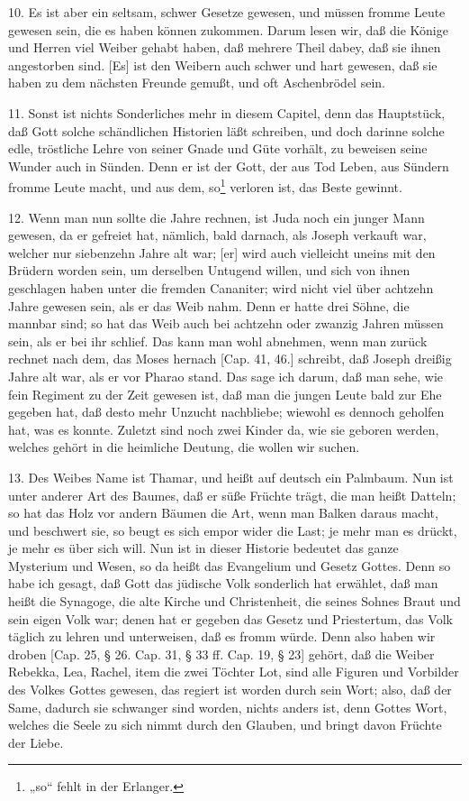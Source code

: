 10. Es ist aber ein seltsam, schwer Gesetze gewesen, und müssen fromme Leute gewesen sein, die es haben können zukommen. Darum lesen wir, daß die Könige und Herren viel Weiber gehabt haben, daß mehrere Theil dabey, daß sie ihnen angestorben sind. [Es] ist den Weibern auch schwer und hart gewesen, daß sie haben zu dem nächsten Freunde gemußt, und oft Aschenbrödel sein.

11. Sonst ist nichts Sonderliches mehr in diesem Capitel, denn das Hauptstück, daß Gott solche schändlichen Historien läßt schreiben, und doch darinne solche edle, tröstliche Lehre von seiner Gnade und Güte vorhält, zu beweisen seine Wunder auch in Sünden. Denn er ist der Gott, der aus Tod Leben, aus Sündern fromme Leute macht, und aus dem, so\footnote{„so“ fehlt in der Erlanger.} verloren ist, das Beste gewinnt.

12. Wenn man nun sollte die Jahre rechnen, ist Juda noch ein junger Mann gewesen, da er gefreiet hat, nämlich, bald darnach, als Joseph verkauft war, welcher nur siebenzehn Jahre alt war; [er] wird auch vielleicht uneins mit den Brüdern worden sein, um derselben Untugend willen, und sich von ihnen geschlagen haben unter die fremden Cananiter; wird nicht viel über achtzehn Jahre gewesen sein, als er das Weib nahm. Denn er hatte drei Söhne, die mannbar sind; so hat das Weib auch bei achtzehn oder zwanzig Jahren müssen sein, als er bei ihr schlief. Das kann man wohl abnehmen, wenn man zurück rechnet nach dem, das Moses hernach [Cap. 41, 46.] schreibt, daß Joseph dreißig Jahre alt war, als er vor Pharao stand. Das sage ich darum, daß man sehe, wie fein Regiment zu der Zeit gewesen ist, daß man die jungen Leute bald zur Ehe gegeben hat, daß desto mehr Unzucht nachbliebe; wiewohl es dennoch geholfen hat, was es konnte. Zuletzt sind noch zwei Kinder da, wie sie geboren werden, welches gehört in die heimliche Deutung, die wollen wir suchen.

13. Des Weibes Name ist Thamar, und heißt
auf deutsch ein Palmbaum. Nun ist unter anderer Art des Baumes, daß er süße Früchte trägt, die man heißt Datteln; so hat das Holz vor andern Bäumen die Art, wenn man Balken daraus macht, und beschwert sie, so beugt es sich empor wider die Last; je mehr man es drückt, je mehr es über sich will. Nun ist in dieser Historie bedeutet das ganze Mysterium und Wesen, so da heißt das Evangelium und Gesetz Gottes. Denn so habe ich gesagt, daß Gott das jüdische Volk sonderlich hat erwählet, daß man heißt die Synagoge, die alte Kirche und Christenheit, die seines Sohnes Braut und sein eigen Volk war; denen hat er gegeben das Gesetz und Priestertum, das Volk täglich zu lehren und unterweisen, daß es fromm würde. Denn also haben wir droben [Cap. 25, § 26. Cap. 31, § 33 ff. Cap. 19, § 23] gehört, daß die Weiber Rebekka, Lea, Rachel, item die zwei Töchter Lot, sind alle Figuren und Vorbilder des Volkes Gottes gewesen, das regiert ist worden durch sein Wort; also, daß der Same, dadurch sie schwanger sind worden, nichts anders ist, denn Gottes Wort, welches die Seele zu sich nimmt durch den Glauben, und bringt davon Früchte der Liebe.


